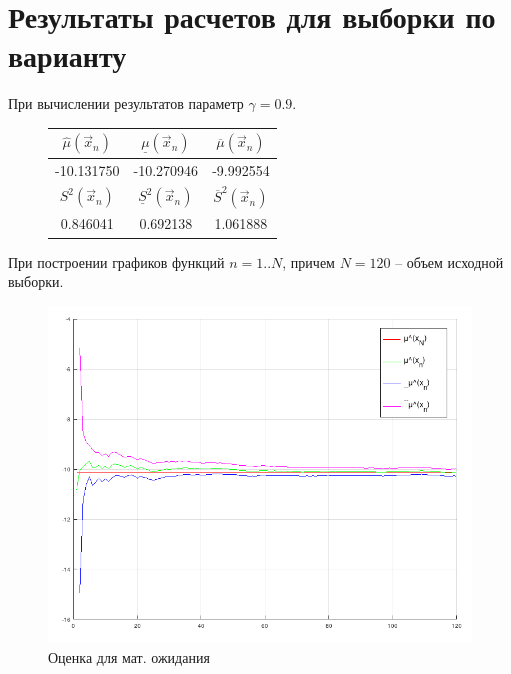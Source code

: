 \chapter{Результаты расчетов для выборки по варианту}

При вычислении результатов параметр $\gamma = 0.9$.

\begin{figure}[H]
	\centering
	\begin{tabular}{|c|c|c|}
		\hline
		$\hat \mu (\vec x_n)$ & $\underline \mu (\vec x_n)$ & $\overline \mu (\vec x_n)$\\
		\hline
		-10.131750 & -10.270946 & -9.992554\\
		\hline
		\hline
		$S^2 (\vec x_n)$ & $\underline S^2 (\vec x_n)$ & $\overline S^2 (\vec x_n)$\\
		\hline
		0.846041 & 0.692138 & 1.061888\\
		\hline
	\end{tabular}
\end{figure}

При построении графиков функций $n = 1..N$, причем $N = 120$ -- объем исходной выборки.

\begin{figure}[H]
	\begin{center}
		\includegraphics[scale=0.46]{assets/mu.png}
	\end{center}
	\caption{Оценка для мат. ожидания}
\end{figure}

